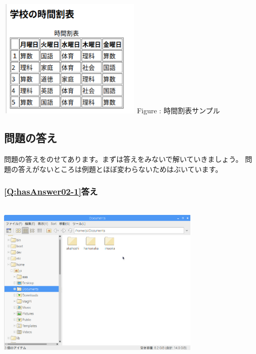 \documentclass[a4paper,12pt]{jarticle}
\begin{document}
\begin{minipage}{6.839cm}
  {\upshape
    \includegraphics[width=6.839cm,height=5.727cm]{textbook-img211.png}
    \newline
    Figure {\theFigure\label{seq:refFigure45}}:
    時間割表サンプル}
\end{minipage}

\bigskip

\flushleft
\clearpage\subsection{\bfseries
  問題の答え}

問題の答えをのせてあります。まずは答えをみないで解いていきましょう。\newline
問題の答えがないところは例題とほぼ変わらないためはぶいています。

\subsubsection{\bfseries
  \ref*{Q:hasAnswer02-1}答え}

\bigskip


\centering
\includegraphics[width=9.763cm,height=8.038cm]{textbook-img212.png}
\flushleft
\end{document}
